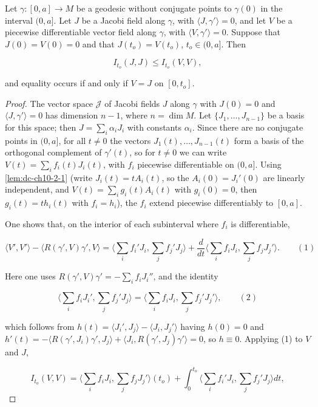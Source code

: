 \begin{lemma}
  \label{lem:dc-ch10-2-2}
  Let $\gamma:[0,a]\to M$ be a geodesic without conjugate points to $\gamma(0)$ in
  the interval $(0,a]$. Let $J$ be a Jacobi field along $\gamma$, with
  $\langle J,\gamma'\rangle=0$, and let $V$ be a piecewise differentiable vector
  field along $\gamma$, with $\langle V,\gamma'\rangle=0$. Suppose that
  $J(0)=V(0)=0$ and that $J(t_o)=V(t_o)$, $t_o\in(0,a]$. Then
  
  $$
  I_{t_o}(J,J)\leq I_{t_o}(V,V),
  $$
  
  and equality occurs if and only if $V=J$ on $[0,t_o]$.
\end{lemma}
\begin{proof}
  The vector space $\mathcal{J}$ of Jacobi fields $J$ along $\gamma$ with
  $J(0)=0$ and $\langle J,\gamma'\rangle=0$ has dimension $n-1$, where $n=\dim M$.
  Let $\{J_1,\dots,J_{n-1}\}$ be a basis for this space; then $J=\sum_i\alpha_i J_i$
  with constants $\alpha_i$. Since there are no conjugate points in $(0,a]$, for
  all $t\neq 0$ the vectors $J_1(t),\dots,J_{n-1}(t)$ form a basis of the
  orthogonal complement of $\gamma'(t)$, so for $t\neq 0$ we can write
  $V(t)=\sum_i f_i(t)J_i(t)$, with $f_i$ piecewise differentiable on $(0,a]$. Using
  \cref{lem:dc-ch10-2-1} (write $J_i(t)=tA_i(t)$, so the $A_i(0)=J_i'(0)$ are linearly
  independent, and $V(t)=\sum_i g_i(t)A_i(t)$ with $g_i(0)=0$, then $g_i(t)=th_i(t)$
  with $f_i=h_i$), the $f_i$ extend piecewise differentiably to $[0,a]$.
  
  One shows that, on the interior of each subinterval where $f_i$ is
  differentiable,
  
  $$
  \langle V',V'\rangle-\langle R(\gamma',V)\gamma',V\rangle=\Big\langle\sum_i f_i'J_i,\sum_j f_j'J_j\Big\rangle+\frac{d}{dt}\Big\langle\sum_i f_iJ_i,\sum_j f_jJ_j'\Big\rangle.\qquad(1)
  $$
  
  Here one uses $R(\gamma',V)\gamma'=-\sum_i f_iJ_i''$, and the identity
  
  $$
  \Big\langle\sum_i f_iJ_i',\sum_j f_j'J_j\Big\rangle=\Big\langle\sum_i f_iJ_i,\sum_j f_j'J_j'\Big\rangle,\qquad(2)
  $$
  
  which follows from $h(t)=\langle J_i',J_j\rangle-\langle J_i,J_j'\rangle$ having
  $h(0)=0$ and $h'(t)=-\langle R(\gamma',J_i)\gamma',J_j\rangle+\langle J_i,R(\gamma',J_j)\gamma'\rangle=0$,
  so $h\equiv 0$. Applying (1) to $V$ and $J$,
  
  $$
  I_{t_o}(V,V)=\Big\langle\sum_i f_iJ_i,\sum_j f_jJ_j'\Big\rangle(t_o)+\int_0^{t_o}\Big\langle\sum_i f_i'J_i,\sum_j f_j'J_j\Big\rangle dt,
  $$
  

\end{proof}
